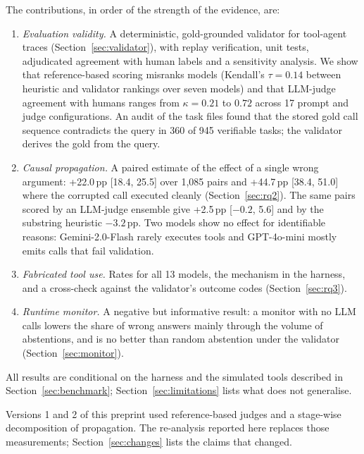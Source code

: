 \documentclass[pdflatex,sn-mathphys-num,Numbered]{sn-jnl}
\newif\ifanon
\newcommand{\pp}{\,pp}
\begin{document}
The contributions, in order of the strength of the evidence, are:
\begin{enumerate}
\item \emph{Evaluation validity.} A deterministic, gold-grounded validator for tool-agent traces (Section~\ref{sec:validator}), with replay verification, unit tests, adjudicated agreement with human labels and a sensitivity analysis. We show that reference-based scoring misranks models (Kendall's $\tau=0.14$ between heuristic and validator rankings over seven models) and that LLM-judge agreement with humans ranges from $\kappa=0.21$ to $0.72$ across 17 prompt and judge configurations. An audit of the task files found that the stored gold call sequence contradicts the query in 360 of 945 verifiable tasks; the validator derives the gold from the query.
\item \emph{Causal propagation.} A paired estimate of the effect of a single wrong argument: +22.0\pp{} [18.4, 25.5] over 1,085 pairs and +44.7\pp{} [38.4, 51.0] where the corrupted call executed cleanly (Section~\ref{sec:rq2}). The same pairs scored by an LLM-judge ensemble give +2.5\pp{} [$-0.2$, 5.6] and by the substring heuristic $-3.2$\pp{}. Two models show no effect for identifiable reasons: Gemini-2.0-Flash rarely executes tools and GPT-4o-mini mostly emits calls that fail validation.
\item \emph{Fabricated tool use.} Rates for all 13 models, the mechanism in the harness, and a cross-check against the validator's outcome codes (Section~\ref{sec:rq3}).
\item \emph{Runtime monitor.} A negative but informative result: a monitor with no LLM calls lowers the share of wrong answers mainly through the volume of abstentions, and is no better than random abstention under the validator (Section~\ref{sec:monitor}).
\end{enumerate}
All results are conditional on the harness and the simulated tools described in Section~\ref{sec:benchmark}; Section~\ref{sec:limitations} lists what does not generalise.

\ifanon
An earlier, non-peer-reviewed version of this study used reference-based judges and a stage-wise decomposition of propagation. The re-analysis reported here replaces those measurements; Section~\ref{sec:changes} lists the claims that changed.
\else
Versions 1 and 2 of this preprint used reference-based judges and a stage-wise decomposition of propagation. The re-analysis reported here replaces those measurements; Section~\ref{sec:changes} lists the claims that changed.
\fi
\end{document}
